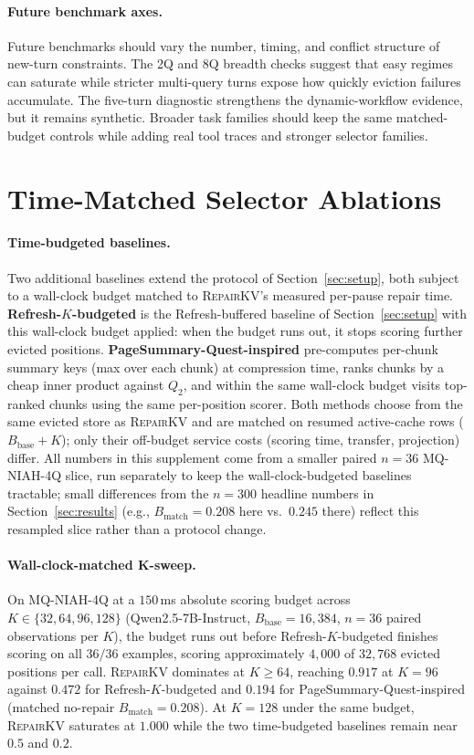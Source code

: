 \documentclass{article}
\newcommand{\repairkv}{\textsc{RepairKV}}
\newcommand{\bbase}{\ensuremath{B_{\mathrm{base}}}}
\newcommand{\bmatch}{\ensuremath{B_{\mathrm{match}}}}
\begin{document}
\paragraph{Future benchmark axes.}
Future benchmarks should vary the number, timing, and conflict structure
of new-turn constraints.
The 2Q and 8Q breadth checks suggest that easy regimes can saturate while
stricter multi-query turns expose how quickly eviction failures
accumulate.
The five-turn diagnostic strengthens the dynamic-workflow evidence, but
it remains synthetic.
Broader task families should keep the same
matched-budget controls while adding real tool traces and stronger
selector families.

\begingroup\section{\texorpdfstring{{Time-Matched Selector Ablations}}{Time-Matched Selector Ablations}}
\label{app:p18-supplement}

\paragraph{Time-budgeted baselines.} Two additional baselines extend the protocol of Section~\ref{sec:setup}, both subject to a wall-clock budget matched to \repairkv{}'s measured per-pause repair time. \textbf{Refresh-$K$-budgeted} is the Refresh-buffered baseline of Section~\ref{sec:setup} with this wall-clock budget applied: when the budget runs out, it stops scoring further evicted positions. \textbf{PageSummary-Quest-inspired} pre-computes per-chunk summary keys (max over each chunk) at compression time, ranks chunks by a cheap inner product against $Q_2$, and within the same wall-clock budget visits top-ranked chunks using the same per-position scorer. Both methods choose from the same evicted store as \repairkv{} and are matched on resumed active-cache rows ($\bbase{+}K$); only their off-budget service costs (scoring time, transfer, projection) differ. All numbers in this supplement come from a smaller paired $n{=}36$ MQ-NIAH-4Q slice, run separately to keep the wall-clock-budgeted baselines tractable; small differences from the $n{=}300$ headline numbers in Section~\ref{sec:results} (e.g., $\bmatch{=}0.208$ here vs.\ $0.245$ there) reflect this resampled slice rather than a protocol change.

\paragraph{Wall-clock-matched K-sweep.} On MQ-NIAH-4Q at a $150$\,ms absolute scoring budget across $K\in\{32,64,96,128\}$ (Qwen2.5-7B-Instruct, $\bbase{=}16{,}384$, $n{=}36$ paired observations per $K$), the budget runs out before Refresh-$K$-budgeted finishes scoring on all $36/36$ examples, scoring approximately $4{,}000$ of $32{,}768$ evicted positions per call. \repairkv{} dominates at $K\geq 64$, reaching $0.917$ at $K{=}96$ against $0.472$ for Refresh-$K$-budgeted and $0.194$ for PageSummary-Quest-inspired (matched no-repair $\bmatch{=}0.208$). At $K{=}128$ under the same budget, \repairkv{} saturates at $1.000$ while the two time-budgeted baselines remain near $0.5$ and $0.2$.
\end{document}
